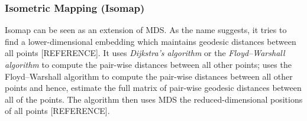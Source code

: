 \documentclass[journal, a4paper]{IEEEtran}
\begin{document}
%	
%	


\hfill
\subsubsection{Isometric Mapping (Isomap)}

Isomap can be seen as an extension of MDS. %
As the name suggests, it tries to find a lower-dimensional embedding which maintains geodesic distances between all points [REFERENCE].  
It uses \textit{Dijkstra's algorithm} or  the \textit{Floyd–Warshall algorithm} to compute the pair-wise distances between all other points;  uses the Floyd–Warshall algorithm to compute the pair-wise distances between all other points and hence, estimate the full matrix of pair-wise geodesic distances between all of the points. The algorithm then uses MDS the reduced-dimensional positions of all points [REFERENCE].


%
\end{document}
